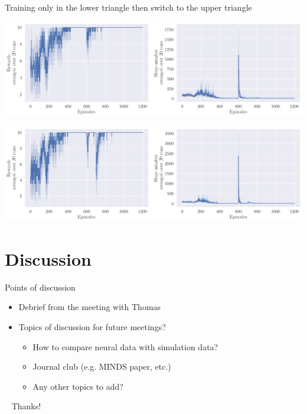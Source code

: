\documentclass[bigger]{beamer}
\begin{document}
\begin{frame}[label={sec:orgcbca335}]{Training only in the lower triangle then switch to the upper triangle}
\begin{center}
\includegraphics[width=.9\linewidth]{img/steps-and-rewards_upper-then-lower1.png}
\end{center}
\begin{center}
\includegraphics[width=.9\linewidth]{img/steps-and-rewards_upper-then-lower2.png}
\end{center}
\end{frame}
\section{Discussion}
\label{sec:org2de0eb7}
\begin{frame}[<+->][label={sec:org44f8a4d}]{Points of discussion}
\begin{itemize}
\item Debrief from the meeting with Thomas
\item Topics of discussion for future meetings?
\begin{itemize}
\item How to compare neural data with simulation data?
\item Journal club (e.g. MINDS paper, etc.)
\item Any other topics to add?
\end{itemize}
\end{itemize}
\end{frame}
\begin{frame}[label={sec:org12ce93e},standout]{~}
Thanks!
\end{frame}
\end{document}
